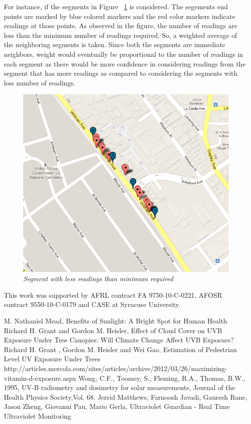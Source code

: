 \documentclass[conference]{IEEETran}
\begin{document}
For instance, if the segments in Figure ~\ref{fig:lessReadings} is considered. The segements end points are marked by blue colored markers and the red color markers indicate readings at those points. As observed in the figure, the number of readings are less than the minimum number of readings required. So, a weighted average of the neighboring segments is taken. Since both the segments are immediate neighbors, weight would eventually be proportional to the number of readings in each segment as there would be more confidence in considering readings from the segment that has more readings as compared to considering the segments with less number of readings. 
\begin{figure}
\begin{center}
\includegraphics[scale=0.4]{lessReadings.png}
\caption{\small \sl Segment with less readings than minimum required}
\label{fig:lessReadings}
\end{center}
\end{figure}




This work was supported by AFRL contract FA 9750-10-C-0221, AFOSR contract 9550-10-C-0179 and CASE at Syracuse University.

\begin{thebibliography}{6}
 M. Nathaniel Mead, Benefits of Sunlight: A Bright Spot for Human Health
 Richard H. Grant and Gordon M. Heisler, Effect of Cloud Cover on UVB Exposure Under Tree Canopies: Will Climate Change Affect UVB Exposure? 
Richard H. Grant , Gordon M. Heisler and Wei Gao, Estimation of Pedestrian Level UV Exposure Under Trees
 http://articles.mercola.com/sites/articles/archive/2012/03/26/maximizing-vitamin-d-exposure.aspx
 Wong, C.F., Toomey, S., Fleming, R.A., Thomas, B.W., 1995, UV-B radiometry and dosimetry for solar measurements, Journal of the Health Physics Society,Vol. 68.
Jerrid Matthews, Farnoosh Javadi, Gauresh Rane, Jason Zheng, Giovanni Pau, Mario Gerla, Ultraviolet Guardian - Real Time Ultraviolet Monitoring
\end{thebibliography}
\end{document}
